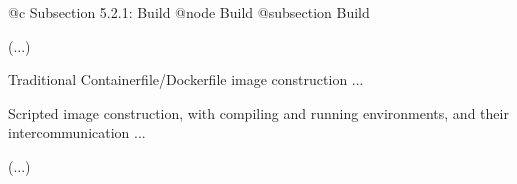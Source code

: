 @c Subsection 5.2.1: Build
@node Build
@subsection Build

(...)

Traditional Containerfile/Dockerfile image construction ...

Scripted image construction, with compiling and running environments, and their intercommunication ...

(...)
